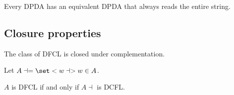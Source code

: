 \begin{lemma}
    Every DPDA has an equivalent DPDA that always reads the entire string.
\end{lemma}
\subsection{Closure properties}
\begin{theorem}
    The class of DFCL is closed under complementation.
\end{theorem}

Let \(A \dashv = \set<w \dashv>{w \in A}\). 
\begin{theorem}
     \(A\) is DFCL if and only if \(A \dashv \) is DCFL.
\end{theorem}
